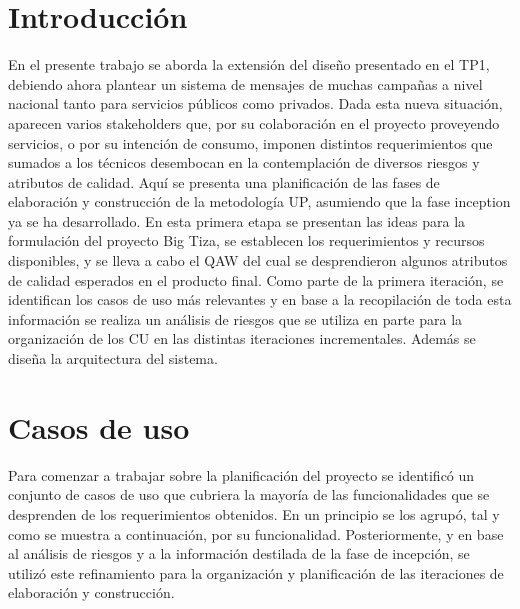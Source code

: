 \documentclass[a4paper, 10pt, twoside]{article}
\begin{document}
\newpage

\tableofcontents

\newpage



\section{Introducción}

En el presente trabajo se aborda la extensión del diseño presentado en el TP1, debiendo ahora plantear un sistema de mensajes de muchas campañas a nivel nacional tanto para servicios públicos como privados. Dada esta nueva situación, aparecen varios stakeholders que, por su colaboración en el proyecto proveyendo servicios, o por su intención de consumo, imponen distintos requerimientos que sumados a los técnicos desembocan en la contemplación de diversos riesgos y atributos de calidad.
Aquí se presenta una planificación de las fases de elaboración y construcción de la metodología UP, asumiendo que la fase inception ya se ha desarrollado. En esta primera etapa se presentan las ideas para la formulación del proyecto Big Tiza, se establecen los requerimientos y recursos disponibles, y se lleva a cabo el QAW del cual se desprendieron algunos atributos de calidad esperados en el producto final. Como parte de la primera iteración, se identifican los casos de uso más relevantes y en base a la recopilación de toda esta información se realiza un análisis de riesgos que se utiliza en parte para la organización de los CU en las distintas iteraciones incrementales. Además se diseña la arquitectura del sistema.

\newpage


\section{Casos de uso}
Para comenzar a trabajar sobre la planificación del proyecto se identificó un conjunto de casos de uso que cubriera la mayoría de las funcionalidades que se desprenden de los requerimientos obtenidos. En un principio se los agrupó, tal y como se muestra a continuación, por su funcionalidad. Posteriormente, y en base al análisis de riesgos y a la información destilada de la fase de incepción, se utilizó este refinamiento para la organización y planificación de las iteraciones de elaboración y construcción.
\end{document}
